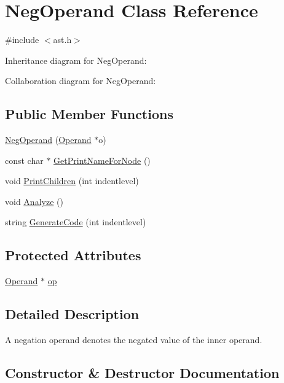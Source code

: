 \hypertarget{class_neg_operand}{}\section{Neg\+Operand Class Reference}
\label{class_neg_operand}


{\ttfamily \#include $<$ast.\+h$>$}



Inheritance diagram for Neg\+Operand\+:


Collaboration diagram for Neg\+Operand\+:
\subsection*{Public Member Functions}
\begin{DoxyCompactItemize}
\item 
\hyperlink{class_neg_operand_a1547202cc23fc43d39682f594bb39107}{Neg\+Operand} (\hyperlink{class_operand}{Operand} $\ast$o)
\item 
const char $\ast$ \hyperlink{class_neg_operand_affbee1241ab0faee9839aa89bdba449d}{Get\+Print\+Name\+For\+Node} ()
\item 
void \hyperlink{class_neg_operand_a03ac72f86e78b28781a8a54dd4789ee9}{Print\+Children} (int indentlevel)
\item 
void \hyperlink{class_neg_operand_a4b7facfe7b6947f5ae0118866b5c013e}{Analyze} ()
\item 
string \hyperlink{class_neg_operand_ab205694eabcb30ce4b70e80022b1e751}{Generate\+Code} (int indentlevel)
\end{DoxyCompactItemize}
\subsection*{Protected Attributes}
\begin{DoxyCompactItemize}
\item 
\hyperlink{class_operand}{Operand} $\ast$ \hyperlink{class_neg_operand_aaf0c1ec10d1b71df28784c897d1a2239}{op}
\end{DoxyCompactItemize}


\subsection{Detailed Description}
A negation operand denotes the negated value of the inner operand. 

\subsection{Constructor \& Destructor Documentation}
\mbox{\label{class_neg_operand_a1547202cc23fc43d39682f594bb39107}} 
